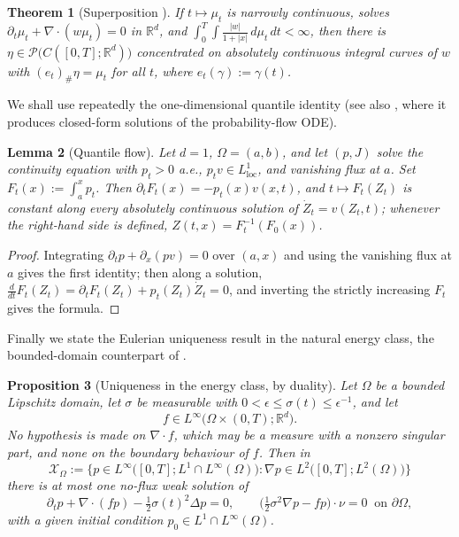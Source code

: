 \documentclass[11pt]{amsart}
\newtheorem{theorem}{Theorem}[section]
\newtheorem{proposition}[theorem]{Proposition}
\newtheorem{lemma}[theorem]{Lemma}
\theoremstyle{definition}
\newcommand{\dive}{\nabla\!\cdot}
\newcommand{\R}{\mathbb{R}}
\newcommand{\PP}{\mathcal{P}}
\newcommand{\dd}{\,d}
\begin{document}
\begin{theorem}[Superposition {\cite{AGS,Ambrosio08}}]
\label{thm:superposition}
If $t\mapsto\mu_t$ is narrowly continuous, solves
$\partial_t\mu_t+\dive(w\mu_t)=0$ in $\R^d$, and
$\int_0^T\!\int\frac{|w|}{1+|x|}\dd\mu_t\dd t<\infty$, then there is
$\eta\in\PP\big(C([0,T];\R^d)\big)$ concentrated on absolutely
continuous integral curves of $w$ with $(e_t)_\#\eta=\mu_t$ for all
$t$, where $e_t(\gamma):=\gamma(t)$.
\end{theorem}

We shall use repeatedly the one-dimensional quantile identity (see
also \cite{pfode}, where it produces closed-form solutions of the
probability-flow ODE).

\begin{lemma}[Quantile flow]\label{lem:quantile}
Let $d=1$, $\Omega=(a,b)$, and let $(p,J)$ solve the continuity
equation with $p_t>0$ a.e., $p_tv\in L^1_{\mathrm{loc}}$, and
vanishing flux at $a$. Set $F_t(x):=\int_a^xp_t$. Then
$\partial_tF_t(x)=-p_t(x)v(x,t)$, and $t\mapsto F_t(Z_t)$ is constant
along every absolutely continuous solution of $\dot Z_t=v(Z_t,t)$;
whenever the right-hand side is defined,
$Z(t,x)=F_t^{-1}(F_0(x))$.
\end{lemma}

\begin{proof}
Integrating $\partial_tp+\partial_x(pv)=0$ over $(a,x)$ and using the
vanishing flux at $a$ gives the first identity; then along a
solution, $\frac{d}{dt}F_t(Z_t)=\partial_tF_t(Z_t)+p_t(Z_t)\dot Z_t
=0$, and inverting the strictly increasing $F_t$ gives the formula.
\end{proof}
Finally we state the Eulerian uniqueness result in the natural
energy class, the bounded-domain counterpart of
\cite[Theorem~3.1]{pfode}.

\begin{proposition}[Uniqueness in the energy class, by duality]
\label{prop:energyuniq}
Let $\Omega$ be a bounded Lipschitz domain, let $\sigma$ be
measurable with $0<\epsilon\le\sigma(t)\le\epsilon^{-1}$, and let
\[
f\in L^\infty\big(\Omega\times(0,T);\R^d\big).
\]
No hypothesis is made on $\dive f$, which may be a measure with a
nonzero singular part, and none on the boundary behaviour of $f$.
Then in
\[
\mathcal{X}_\Omega:=\Big\{p\in L^\infty\big([0,T];L^1\cap
L^\infty(\Omega)\big):\nabla p\in
L^2\big([0,T];L^2(\Omega)\big)\Big\}
\]
there is at most one no-flux weak solution of
\begin{equation}\label{eq:FPnoflux}
\partial_tp+\dive(fp)-\tfrac12\sigma(t)^2\Delta p=0,
\qquad
\big(\tfrac12\sigma^2\nabla p-fp\big)\cdot\nu=0
\ \text{ on }\partial\Omega,
\end{equation}
with a given initial condition $p_0\in L^1\cap L^\infty(\Omega)$.
\end{proposition}
\end{document}
